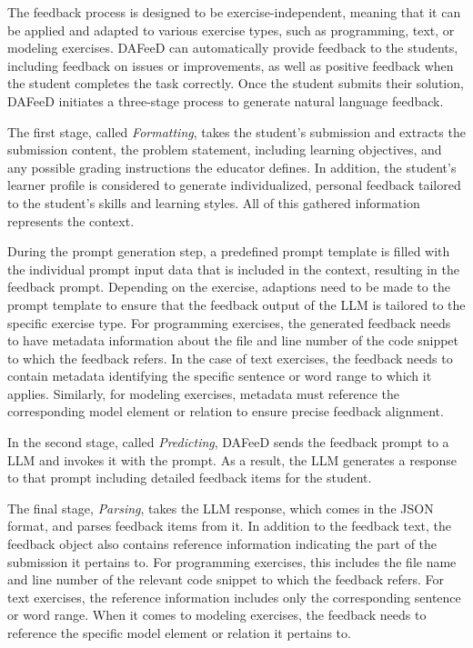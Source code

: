 \documentclass[sigconf,screen,review,anonymous]{acmart}
\begin{document}
The feedback process is designed to be exercise-independent, meaning that it can be applied and adapted to various exercise types, such as programming, text, or modeling exercises.
DAFeeD can automatically provide feedback to the students, including feedback on issues or improvements, as well as positive feedback when the student completes the task correctly.
Once the student submits their solution, DAFeeD initiates a three-stage process to generate natural language feedback.

The first stage, called \textit{Formatting}, takes the student's submission and extracts the submission content, the problem statement, including learning objectives, and any possible grading instructions the educator defines.
In addition, the student's learner profile \cite{alexander:1998:ProfilingDifferencesStudents} is considered to generate individualized, personal feedback tailored to the student's skills and learning styles.
All of this gathered information represents the context.

During the prompt generation step, a predefined prompt template is filled with the individual prompt input data that is included in the context, resulting in the feedback prompt.
Depending on the exercise, adaptions need to be made to the prompt template to ensure that the feedback output of the LLM is tailored to the specific exercise type.
For programming exercises, the generated feedback needs to have metadata information about the file and line number of the code snippet to which the feedback refers.
In the case of text exercises, the feedback needs to contain metadata identifying the specific sentence or word range to which it applies.
Similarly, for modeling exercises, metadata must reference the corresponding model element or relation to ensure precise feedback alignment.

In the second stage, called \textit{Predicting}, DAFeeD sends the feedback prompt to a LLM and invokes it with the prompt. 
As a result, the LLM generates a response to that prompt including detailed feedback items for the student.

The final stage, \textit{Parsing}, takes the LLM response, which comes in the JSON format, and parses feedback items from it. 
In addition to the feedback text, the feedback object also contains reference information indicating the part of the submission it pertains to.
For programming exercises, this includes the file name and line number of the relevant code snippet to which the feedback refers.
For text exercises, the reference information includes only the corresponding sentence or word range.
When it comes to modeling exercises, the feedback needs to reference the specific model element or relation it pertains to.
\end{document}

